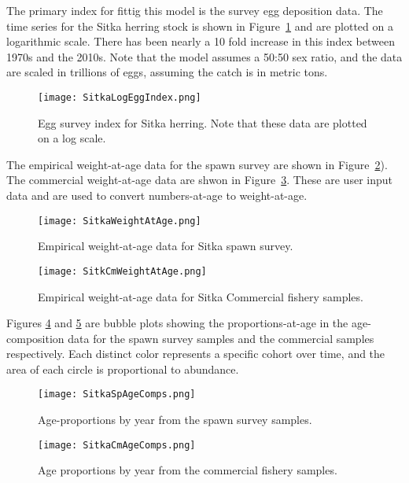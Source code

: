 \documentclass[12pt,letterpaper]{article}
\begin{document}
  The primary index for fittig this model is the survey egg deposition data. The time series for the Sitka herring stock is shown in Figure~\ref{fig:SitkaEggIndex} and are plotted on a logarithmic scale.  There has been nearly a 10 fold increase in this index between 1970s and the 2010s.  Note that the model assumes a 50:50 sex ratio, and the data are scaled in trillions of eggs, assuming the catch is in metric tons.


  \begin{figure}[tb]
    \centering
    \texttt{[image: SitkaLogEggIndex.png]}
    \caption{Egg survey index for Sitka herring. Note that these data are plotted on a log scale.}
    \label{fig:SitkaEggIndex}
  \end{figure}


  The empirical weight-at-age data for the spawn survey are shown in Figure~\ref{fig:SitkaWeightAtAge}).  The commercial weight-at-age data are shwon in Figure~\ref{fig:SitkCmWeighAtAge}. These are user input data and are used to convert numbers-at-age to weight-at-age.

  \begin{figure}[tb]
    \centering
    \texttt{[image: SitkaWeightAtAge.png]}
    \caption{Empirical weight-at-age data for Sitka spawn survey.}
    \label{fig:SitkaWeightAtAge}
  \end{figure}

  \begin{figure}[tb]
    \centering
    \texttt{[image: SitkCmWeightAtAge.png]}
    \caption{Empirical weight-at-age data for Sitka Commercial fishery samples.}
    \label{fig:SitkCmWeighAtAge}
  \end{figure}

  Figures \ref{fig:SitkaSpAgeComps} and \ref{fig:SitkaCmAgeComps} are bubble plots showing the proportions-at-age in the age-composition data for the spawn survey samples and the commercial samples respectively. Each distinct color represents a specific cohort over time, and the area of each circle is proportional to abundance.

  \begin{figure}[tb]
    \centering
    \texttt{[image: SitkaSpAgeComps.png]}
    \caption{Age-proportions by year from the spawn survey samples.}
    \label{fig:SitkaSpAgeComps}
  \end{figure}  

  \begin{figure}[tb]
    \centering
    \texttt{[image: SitkaCmAgeComps.png]}
    \caption{Age proportions by year from the commercial fishery samples.}
    \label{fig:SitkaCmAgeComps}
  \end{figure}
\end{document}
